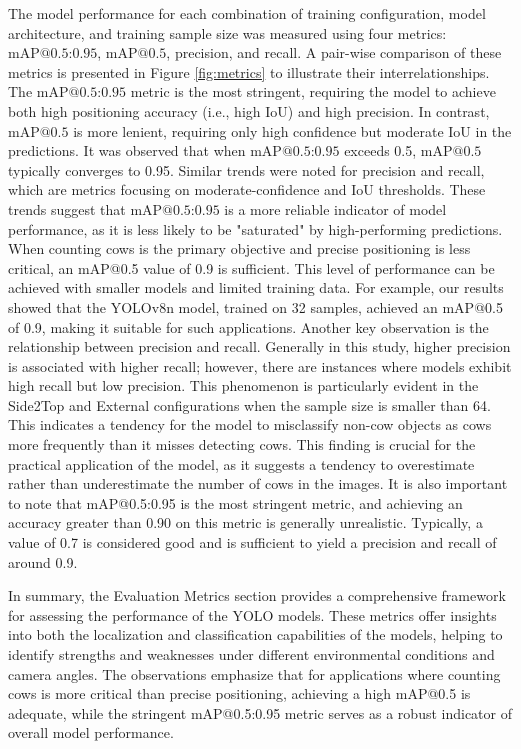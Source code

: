 The model performance for each combination of training configuration, model architecture, and training sample size was measured using four metrics: $\text{mAP@{0.5:0.95}}$, $\text{mAP@{0.5}}$, precision, and recall. A pair-wise comparison of these metrics is presented in Figure \ref{fig:metrics} to illustrate their interrelationships. The $\text{mAP@{0.5:0.95}}$ metric is the most stringent, requiring the model to achieve both high positioning accuracy (i.e., high IoU) and high precision. In contrast, $\text{mAP@{0.5}}$ is more lenient, requiring only high confidence but moderate IoU in the predictions. It was observed that when $\text{mAP@{0.5:0.95}}$ exceeds 0.5, $\text{mAP@{0.5}}$ typically converges to 0.95. Similar trends were noted for precision and recall, which are metrics focusing on moderate-confidence and IoU thresholds. These trends suggest that $\text{mAP@{0.5:0.95}}$ is a more reliable indicator of model performance, as it is less likely to be "saturated" by high-performing predictions. When counting cows is the primary objective and precise positioning is less critical, an mAP@0.5 value of 0.9 is sufficient. This level of performance can be achieved with smaller models and limited training data. For example, our results showed that the YOLOv8n model, trained on 32 samples, achieved an mAP@0.5 of 0.9, making it suitable for such applications.
Another key observation is the relationship between precision and recall. Generally in this study, higher precision is associated with higher recall; however, there are instances where models exhibit high recall but low precision. This phenomenon is particularly evident in the Side2Top and External configurations when the sample size is smaller than 64. This indicates a tendency for the model to misclassify non-cow objects as cows more frequently than it misses detecting cows. This finding is crucial for the practical application of the model, as it suggests a tendency to overestimate rather than underestimate the number of cows in the images.
It is also important to note that mAP@0.5:0.95 is the most stringent metric, and achieving an accuracy greater than 0.90 on this metric is generally unrealistic. Typically, a value of 0.7 is considered good and is sufficient to yield a precision and recall of around 0.9.

In summary, the Evaluation Metrics section provides a comprehensive framework for assessing the performance of the YOLO models. These metrics offer insights into both the localization and classification capabilities of the models, helping to identify strengths and weaknesses under different environmental conditions and camera angles. The observations emphasize that for applications where counting cows is more critical than precise positioning, achieving a high mAP@0.5 is adequate, while the stringent mAP@0.5:0.95 metric serves as a robust indicator of overall model performance.

